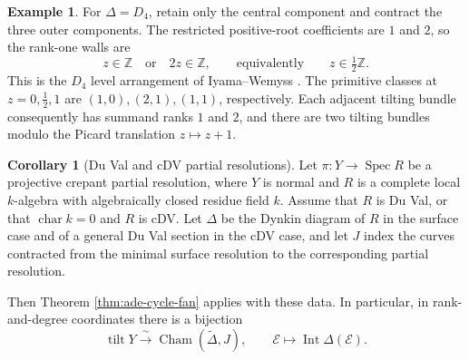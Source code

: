 \documentclass[a4paper,reqno]{amsart}
\def\E{\mathcal{E}}
\DeclareMathOperator{\Spec}{Spec}
\DeclareMathOperator{\tilt}{tilt}
\theoremstyle{definition}
\newtheorem{Cor}[Thm]{Corollary}
\newtheorem{Ex}[Thm]{Example}
\begin{document}
\begin{Ex}
For $\Delta=D_4$, retain only the central component and contract the three outer components. The restricted positive-root coefficients are $1$ and $2$, so the rank-one walls are
\[
z\in\mathbb Z\quad\text{or}\quad 2z\in\mathbb Z,
\qquad\text{equivalently}\qquad z\in\tfrac12\mathbb Z.
\]
This is the $D_4$ level arrangement of Iyama--Wemyss \cite[Example 2.9]{IWTC}. The primitive classes at $z=0,\frac12,1$ are $(1,0),(2,1),(1,1)$, respectively. Each adjacent tilting bundle consequently has summand ranks $1$ and $2$, and there are two tilting bundles modulo the Picard translation $z\mapsto z+1$.
\end{Ex}

\begin{Cor}[Du Val and cDV partial resolutions]\label{cor:duval-cdv-tilting}
Let $\pi\colon Y\to\Spec R$ be a projective crepant partial resolution, where $Y$ is normal and $R$ is a complete local $k$-algebra with algebraically closed residue field $k$. Assume that $R$ is Du Val, or that $\operatorname{char}k=0$ and $R$ is cDV. Let $\Delta$ be the Dynkin diagram of $R$ in the surface case and of a general Du Val section in the cDV case, and let $J$ index the curves contracted from the minimal surface resolution to the corresponding partial resolution.

Then Theorem \ref{thm:ade-cycle-fan} applies with these data. In particular, in rank-and-degree coordinates there is a bijection
\[
\tilt Y\xrightarrow{\ \sim\ }\operatorname{Cham}(\widetilde\Delta,J),
\qquad \E\longmapsto\operatorname{Int}\Delta(\E).
\]
\end{Cor}
\end{document}
